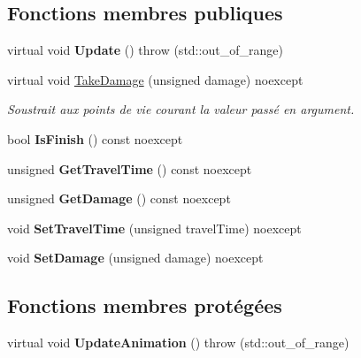 \subsection*{Fonctions membres publiques}
\begin{DoxyCompactItemize}
\item 
\mbox{\label{classmy_1_1Bullet_a4d8f83b7d45b3a427ef622b30504c994}} 
virtual void {\bfseries Update} ()  throw (std\+::out\+\_\+of\+\_\+range)
\item 
virtual void \hyperlink{classmy_1_1Bullet_add56b393dfba4c70de2713d4a3c917c3}{Take\+Damage} (unsigned damage) noexcept
\begin{DoxyCompactList}\small\item\em Soustrait aux points de vie courant la valeur passé en argument. \end{DoxyCompactList}\item 
\mbox{\label{classmy_1_1Bullet_ac09bef4306b861082d6faf51ffa196ec}} 
bool {\bfseries Is\+Finish} () const noexcept
\item 
\mbox{\label{classmy_1_1Bullet_ae27237c0484100a583acb3c1368ac748}} 
unsigned {\bfseries Get\+Travel\+Time} () const noexcept
\item 
\mbox{\label{classmy_1_1Bullet_aa892fbd61eb8400b1edc0510f520222f}} 
unsigned {\bfseries Get\+Damage} () const noexcept
\item 
\mbox{\label{classmy_1_1Bullet_abce688ee87e4fc3127138ffa9188a176}} 
void {\bfseries Set\+Travel\+Time} (unsigned travel\+Time) noexcept
\item 
\mbox{\label{classmy_1_1Bullet_ae283ab2faf88aa846a59df9eb52b5c10}} 
void {\bfseries Set\+Damage} (unsigned damage) noexcept
\end{DoxyCompactItemize}
\subsection*{Fonctions membres protégées}
\begin{DoxyCompactItemize}
\item 
\mbox{\label{classmy_1_1Bullet_a6cf422fe6c782a0455a21fa38b999464}} 
virtual void {\bfseries Update\+Animation} ()  throw (std\+::out\+\_\+of\+\_\+range)
\end{DoxyCompactItemize}
